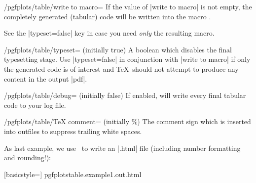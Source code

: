 \begin{key}{/pgfplots/table/write to macro=}
	If the value of |write to macro| is not empty, the completely generated (tabular) code will be written into the macro .

	See the |typeset=false| key in case you need \emph{only} the resulting macro.
\end{key}


\begin{key}{/pgfplots/table/typeset= (initially true)}
	A boolean which disables the final typesetting stage. Use |typeset=false| in conjunction with |write to macro| if only the generated code is of interest and \TeX\ should not attempt to produce any content in the output |pdf|.	
\end{key}

\begin{key}{/pgfplots/table/debug= (initially false)}
	If enabled, will write every final tabular code to your log file.
\end{key}

\begin{key}{/pgfplots/table/TeX comment= (initially \%)}
	The comment sign which is inserted into outfiles to suppress trailing white spaces.
\end{key}

\noindent As last example, we use \PGFPlotstable\ to write an |.html| file (including number formatting and rounding!):
\begin{codeexample}[width=8cm]

	[basicstyle=\ttfamily\footnotesize]
	{pgfplotstable.example1.out.html}
\end{codeexample}

